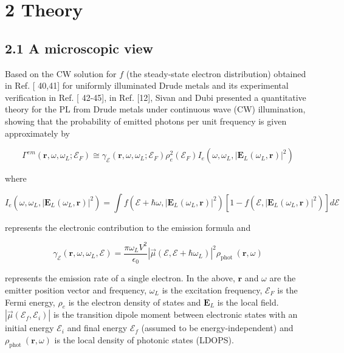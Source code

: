 \documentclass[10pt]{article}
\begin{document}
\section*{2 Theory}
\subsection*{2.1 A microscopic view}
Based on the CW solution for $f$ (the steady-state electron distribution) obtained in Ref. [ 40,41] for uniformly illuminated Drude metals and its experimental verification in Ref. [ 42-45], in Ref. [12], Sivan and Dubi presented a quantitative theory for the PL from Drude metals under continuous wave (CW) illumination, showing that the probability of emitted photons per unit frequency is given approximately by


\begin{equation*}
\Gamma^{e m}\left(\mathbf{r}, \omega, \omega_{L} ; \mathcal{E}_{F}\right) \cong \gamma_{\mathcal{E}}\left(\mathbf{r}, \omega, \omega_{L} ; \mathcal{E}_{F}\right) \rho_{e}^{2}\left(\mathcal{E}_{F}\right) I_{e}\left(\omega, \omega_{L},\left|\mathbf{E}_{L}\left(\omega_{L}, \mathbf{r}\right)\right|^{2}\right) \tag{1}
\end{equation*}


where


\begin{equation*}
I_{e}\left(\omega, \omega_{L},\left|\mathbf{E}_{L}\left(\omega_{L}, \mathbf{r}\right)\right|^{2}\right)=\int f\left(\mathcal{E}+\hbar \omega,\left|\mathbf{E}_{L}\left(\omega_{L}, \mathbf{r}\right)\right|^{2}\right)\left[1-f\left(\mathcal{E},\left|\mathbf{E}_{L}\left(\omega_{L}, \mathbf{r}\right)\right|^{2}\right)\right] d \mathcal{E} \tag{2}
\end{equation*}


represents the electronic contribution to the emission formula and


\begin{equation*}
\gamma_{\mathcal{E}}\left(\mathbf{r}, \omega, \omega_{L}, \mathcal{E}\right)=\frac{\pi \omega_{L} V^{2}}{\epsilon_{0}}\left|\vec{\mu}\left(\mathcal{E}, \mathcal{E}+\hbar \omega_{L}\right)\right|^{2} \rho_{\text {phot }}(\mathbf{r}, \omega) \tag{3}
\end{equation*}


represents the emission rate of a single electron. In the above, $\mathbf{r}$ and $\omega$ are the emitter position vector and frequency, $\omega_{L}$ is the excitation frequency, $\mathcal{E}_{F}$ is the Fermi energy, $\rho_{e}$ is the electron density of states and $\mathbf{E}_{L}$ is the local field. $\left|\vec{\mu}\left(\mathcal{E}_{f}, \mathcal{E}_{i}\right)\right|$ is the transition dipole moment between electronic states with an initial energy $\mathcal{E}_{i}$ and final energy $\mathcal{E}_{f}$ (assumed to be energy-independent) and $\rho_{\text {phot }}(\mathbf{r}, \omega)$ is the local density of photonic states (LDOPS).
\end{document}
